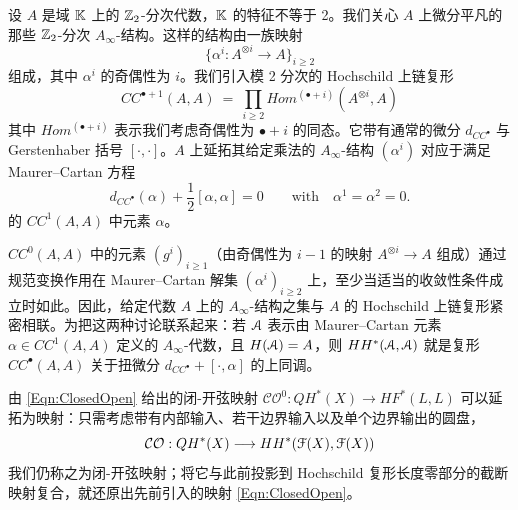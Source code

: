 设 $A$ 是域 $\mathbb{K}$ 上的 $\mathbb{Z}_2$-分次代数，$\mathbb{K}$ 的特征不等于 2。我们关心 $A$ 上微分平凡的那些 $\mathbb{Z}_2$-分次 $A_{\infty}$-结构。这样的结构由一族映射
\[
\{ \alpha^i: A^{\otimes i} \rightarrow A \}_{i\geq 2}
\]
组成，其中 $\alpha^i$ 的奇偶性为 $i$。我们引入模 2 分次的 Hochschild 上链复形
\[
CC^{\bullet+1}(A,A) \ = \ \prod_{i \geq 2} Hom^{(\bullet+i)}(A^{\otimes i},A)
\]
其中 $Hom^{(\bullet +i)}$ 表示我们考虑奇偶性为 $\bullet+i$ 的同态。它带有通常的微分 $d_{CC^{\bullet}}$ 与 Gerstenhaber 括号 $[\cdot, \cdot]$。$A$ 上延拓其给定乘法的 $A_{\infty}$-结构 $(\alpha^i)$ 对应于满足 Maurer--Cartan 方程
\begin{equation} \label{Eqn:Maurer-Cartan}
d_{CC^{\bullet}} (\alpha) + \frac{1}{2} [\alpha, \alpha] = 0\qquad \textrm{with} \quad \alpha^1 = \alpha^2 = 0.
\end{equation}
的 $CC^{1}(A,A)$ 中元素 $\alpha$。

$CC^0(A,A)$ 中的元素 $(g^i)_{i\geq 1}$（由奇偶性为 $i-1$ 的映射 $A^{\otimes i} \rightarrow A$ 组成）通过规范变换作用在 Maurer--Cartan 解集 $(\alpha^i)_{i\geq 2}$ 上，至少当适当的收敛性条件成立时如此。因此，给定代数 $A$ 上的 $A_{\infty}$-结构之集与 $A$ 的 Hochschild 上链复形紧密相联。为把这两种讨论联系起来：若 $\EuScript{A}$ 表示由 Maurer--Cartan 元素 $\alpha \in CC^1(A,A)$ 定义的 $A_{\infty}$-代数，且 $H(\EuScript{A}) = A$，则 $HH^*(\EuScript{A},\EuScript{A})$ 就是复形 $CC^{\bullet}(A,A)$ 关于扭微分 $d_{CC^{\bullet}} + [\cdot, \alpha]$ 的上同调。

由 \eqref{Eqn:ClosedOpen} 给出的闭-开弦映射 $\mathcal{CO}^0: QH^*(X) \rightarrow HF^*(L,L)$ 可以延拓为映射：只需考虑带有内部输入、若干边界输入以及单个边界输出的圆盘，
\begin{equation} \label{Eqn:COHH}
\mathcal{CO}: QH^*(X) \longrightarrow HH^*(\EuScript{F}(X), \EuScript{F}(X))
\end{equation}
我们仍称之为闭-开弦映射；将它与此前投影到 Hochschild 复形长度零部分的截断映射复合，就还原出先前引入的映射 \eqref{Eqn:ClosedOpen}。

